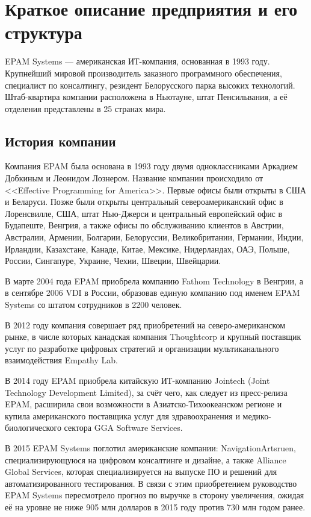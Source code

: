 \section{Краткое описание предприятия и его структура}

EPAM Systems — американская ИТ-компания, основанная в 1993 году. Крупнейший мировой производитель заказного программного обеспечения, специалист по консалтингу, резидент Белорусского парка высоких технологий. Штаб-квартира компании расположена в Ньютауне, штат Пенсильвания, а её отделения представлены в 25 странах мира.

\subsection{История компании}

Компания EPAM была основана в 1993 году двумя одноклассниками Аркадием Добкиным и Леонидом Лознером. Название компании происходило от <<Effective Programming for America>>. Первые офисы были открыты в США и Беларуси. Позже были открыты центральный североамериканский офис в Лоренсвилле, США, штат Нью-Джерси и центральный европейский офис в Будапеште, Венгрия, а также офисы по обслуживанию клиентов в Австрии, Австралии, Армении, Болгарии, Белоруссии, Великобритании, Германии, Индии, Ирландии, Казахстане, Канаде, Китае, Мексике, Нидерландах, ОАЭ, Польше, России, Сингапуре, Украине, Чехии, Швеции, Швейцарии.

В марте 2004 года EPAM приобрела компанию Fathom Technology в Венгрии, а в сентябре 2006 VDI в России, образовав единую компанию под именем EPAM Systems со штатом сотрудников в 2200 человек.

В 2012 году компания совершает ряд приобретений на северо-американском рынке, в числе которых канадская компания Thoughtcorp и крупный поставщик услуг по разработке цифровых стратегий и организации мультиканального взаимодействия Empathy Lab.

В 2014 году EPAM приобрела китайскую ИТ-компанию Jointech (Joint Technology Development Limited), за счёт чего, как следует из пресс-релиза EPAM, расширила свои возможности в Азиатско-Тихоокеанском регионе и купила американского поставщика услуг для здравоохранения и медико-биологического сектора GGA Software Services.

В 2015 EPAM Systems поглотил американские компании: NavigationArtsruen, специализирующуюся на цифровом консалтинге и дизайне, а также Alliance Global Services, которая специализируется на выпуске ПО и решений для автоматизированного тестирования. В связи с этим приобретением руководство EPAM Systems пересмотрело прогноз по выручке в сторону увеличения, ожидая её на уровне не ниже 905 млн долларов в 2015 году против 730 млн годом ранее.

